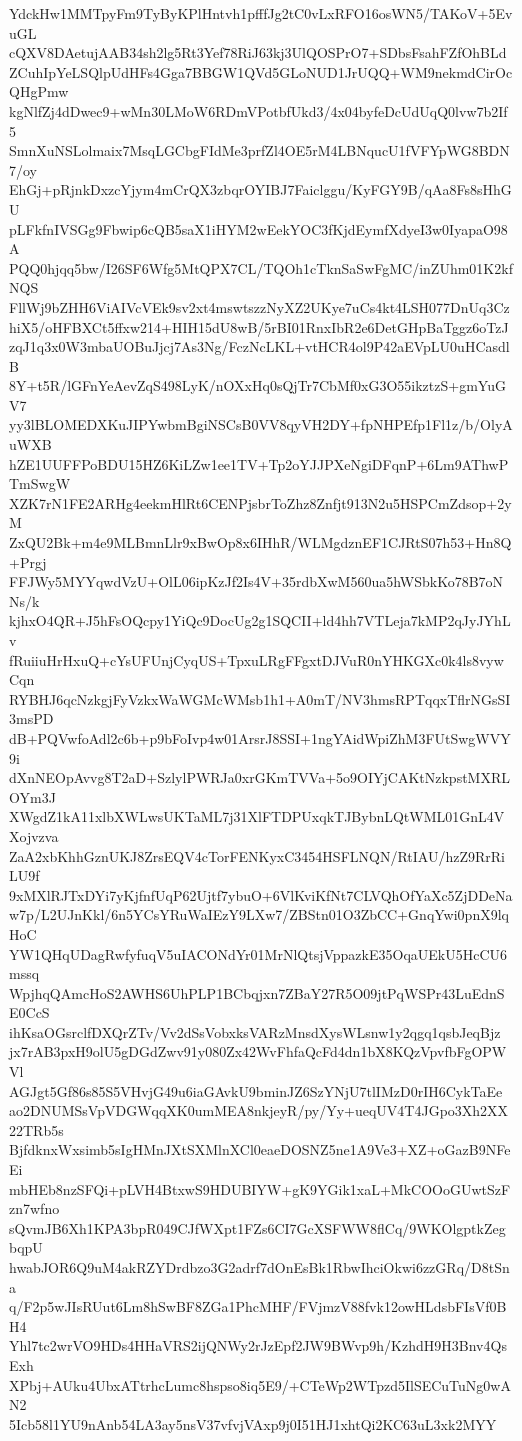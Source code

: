 YdckHw1MMTpyFm9TyByKPlHntvh1pfffJg2tC0vLxRFO16osWN5/TAKoV+5EvuGL
cQXV8DAetujAAB34sh2lg5Rt3Yef78RiJ63kj3UlQOSPrO7+SDbsFsahFZfOhBLd
ZCuhIpYeLSQlpUdHFs4Gga7BBGW1QVd5GLoNUD1JrUQQ+WM9nekmdCirOcQHgPmw
kgNlfZj4dDwec9+wMn30LMoW6RDmVPotbfUkd3/4x04byfeDcUdUqQ0lvw7b2If5
SmnXuNSLolmaix7MsqLGCbgFIdMe3prfZl4OE5rM4LBNqucU1fVFYpWG8BDN7/oy
EhGj+pRjnkDxzcYjym4mCrQX3zbqrOYIBJ7Faiclggu/KyFGY9B/qAa8Fs8sHhGU
pLFkfnIVSGg9Fbwip6cQB5saX1iHYM2wEekYOC3fKjdEymfXdyeI3w0IyapaO98A
PQQ0hjqq5bw/I26SF6Wfg5MtQPX7CL/TQOh1cTknSaSwFgMC/inZUhm01K2kfNQS
FllWj9bZHH6ViAIVcVEk9sv2xt4mswtszzNyXZ2UKye7uCs4kt4LSH077DnUq3Cz
hiX5/oHFBXCt5ffxw214+HIH15dU8wB/5rBI01RnxIbR2e6DetGHpBaTggz6oTzJ
zqJ1q3x0W3mbaUOBuJjcj7As3Ng/FczNcLKL+vtHCR4ol9P42aEVpLU0uHCasdlB
8Y+t5R/lGFnYeAevZqS498LyK/nOXxHq0sQjTr7CbMf0xG3O55ikztzS+gmYuGV7
yy3lBLOMEDXKuJIPYwbmBgiNSCsB0VV8qyVH2DY+fpNHPEfp1Fl1z/b/OlyAuWXB
hZE1UUFFPoBDU15HZ6KiLZw1ee1TV+Tp2oYJJPXeNgiDFqnP+6Lm9AThwPTmSwgW
XZK7rN1FE2ARHg4eekmHlRt6CENPjsbrToZhz8Znfjt913N2u5HSPCmZdsop+2yM
ZxQU2Bk+m4e9MLBmnLlr9xBwOp8x6IHhR/WLMgdznEF1CJRtS07h53+Hn8Q+Prgj
FFJWy5MYYqwdVzU+OlL06ipKzJf2Is4V+35rdbXwM560ua5hWSbkKo78B7oNNs/k
kjhxO4QR+J5hFsOQcpy1YiQc9DocUg2g1SQCII+ld4hh7VTLeja7kMP2qJyJYhLv
fRuiiuHrHxuQ+cYsUFUnjCyqUS+TpxuLRgFFgxtDJVuR0nYHKGXc0k4ls8vywCqn
RYBHJ6qcNzkgjFyVzkxWaWGMcWMsb1h1+A0mT/NV3hmsRPTqqxTflrNGsSI3msPD
dB+PQVwfoAdl2c6b+p9bFoIvp4w01ArsrJ8SSI+1ngYAidWpiZhM3FUtSwgWVY9i
dXnNEOpAvvg8T2aD+SzlylPWRJa0xrGKmTVVa+5o9OIYjCAKtNzkpstMXRLOYm3J
XWgdZ1kA11xlbXWLwsUKTaML7j31XlFTDPUxqkTJBybnLQtWML01GnL4VXojvzva
ZaA2xbKhhGznUKJ8ZrsEQV4cTorFENKyxC3454HSFLNQN/RtIAU/hzZ9RrRiLU9f
9xMXlRJTxDYi7yKjfnfUqP62Ujtf7ybuO+6VlKviKfNt7CLVQhOfYaXc5ZjDDeNa
w7p/L2UJnKkl/6n5YCsYRuWaIEzY9LXw7/ZBStn01O3ZbCC+GnqYwi0pnX9lqHoC
YW1QHqUDagRwfyfuqV5uIACONdYr01MrNlQtsjVppazkE35OqaUEkU5HcCU6mssq
WpjhqQAmcHoS2AWHS6UhPLP1BCbqjxn7ZBaY27R5O09jtPqWSPr43LuEdnSE0CcS
ihKsaOGsrclfDXQrZTv/Vv2dSsVobxksVARzMnsdXysWLsnw1y2qgq1qsbJeqBjz
jx7rAB3pxH9olU5gDGdZwv91y080Zx42WvFhfaQcFd4dn1bX8KQzVpvfbFgOPWVl
AGJgt5Gf86s85S5VHvjG49u6iaGAvkU9bminJZ6SzYNjU7tlIMzD0rIH6CykTaEe
ao2DNUMSsVpVDGWqqXK0umMEA8nkjeyR/py/Yy+ueqUV4T4JGpo3Xh2XX22TRb5s
BjfdknxWxsimb5sIgHMnJXtSXMlnXCl0eaeDOSNZ5ne1A9Ve3+XZ+oGazB9NFeEi
mbHEb8nzSFQi+pLVH4BtxwS9HDUBIYW+gK9YGik1xaL+MkCOOoGUwtSzFzn7wfno
sQvmJB6Xh1KPA3bpR049CJfWXpt1FZs6CI7GcXSFWW8flCq/9WKOlgptkZegbqpU
hwabJOR6Q9uM4akRZYDrdbzo3G2adrf7dOnEsBk1RbwIhciOkwi6zzGRq/D8tSna
q/F2p5wJIsRUut6Lm8hSwBF8ZGa1PhcMHF/FVjmzV88fvk12owHLdsbFIsVf0BH4
Yhl7tc2wrVO9HDs4HHaVRS2ijQNWy2rJzEpf2JW9BWvp9h/KzhdH9H3Bnv4QsExh
XPbj+AUku4UbxATtrhcLumc8hspso8iq5E9/+CTeWp2WTpzd5IlSECuTuNg0wAN2
5Icb58l1YU9nAnb54LA3ay5nsV37vfvjVAxp9j0I51HJ1xhtQi2KC63uL3xk2MYY
